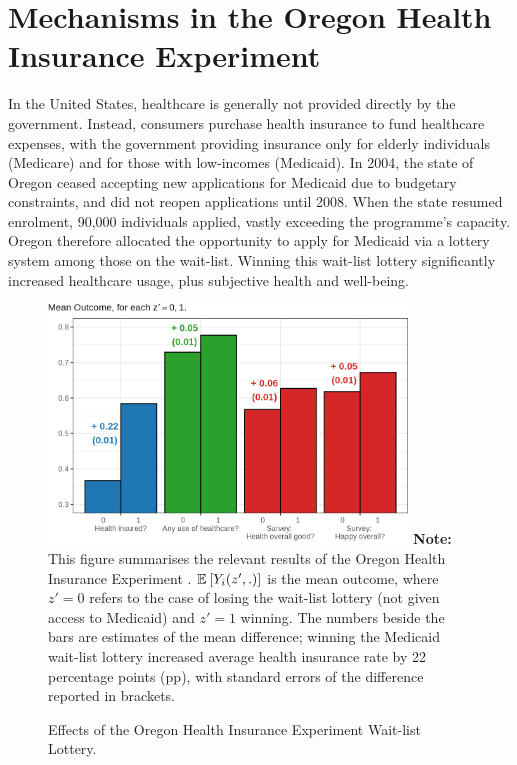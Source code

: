 \section{Mechanisms in the Oregon Health Insurance Experiment}
\label{sec:lottery}
In the United States, healthcare is generally not provided directly by the government.
Instead, consumers purchase health insurance to fund healthcare expenses, with the government providing insurance only for elderly individuals (Medicare) and for those with low-incomes (Medicaid).
In 2004, the state of Oregon ceased accepting new applications for Medicaid due to budgetary constraints, and did not reopen applications until 2008.
When the state resumed enrolment, 90,000 individuals applied, vastly exceeding the programme's capacity.
Oregon therefore allocated the opportunity to apply for Medicaid via a lottery system among those on the wait-list.
Winning this wait-list lottery significantly increased healthcare usage, plus subjective health and well-being.

\begin{figure}[!htbp]
    \caption{Effects of the Oregon Health Insurance Experiment Wait-list Lottery.}
    \centering
    \includegraphics[width=0.85\textwidth]{sections/figures/insurance-effects.png}
    \label{fig:healthinsurance-effects}
    \justify
    \footnotesize    
    \textbf{Note:}
    This figure summarises the relevant results of the Oregon Health Insurance Experiment \citep{finkelstein2008oregon}.
    $\mathbb{E}_{} \left[ Y_i(z',.) \right]$ is the mean outcome, where $z' = 0$ refers to the case of losing the wait-list lottery (not given access to Medicaid) and $z' = 1$ winning.
    The numbers beside the bars are estimates of the mean difference; winning the Medicaid wait-list lottery increased average health insurance rate by 22 percentage points (pp), with standard errors of the difference reported in brackets.
\end{figure}


